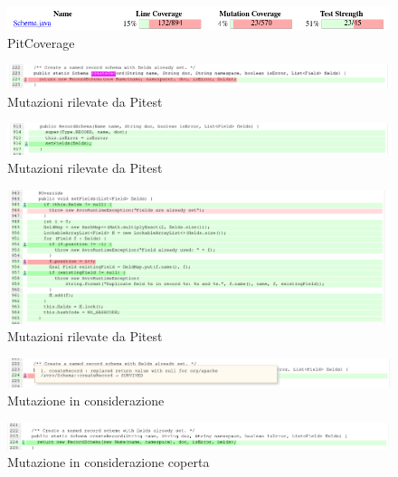 \documentclass[12pt, a4paper]{article}
\begin{document}
  \begin{figure}
    \includegraphics[width=\linewidth]{./images/create_record/PitCoverage1.png}
    \caption{PitCoverage}
    \label{fig:PitMutationCreateRecord1}
  \end{figure}

  \begin{figure}
    \includegraphics[width=\linewidth]{./images/create_record/PitCoverage2.png}
    \caption{Mutazioni rilevate da Pitest}
    \label{fig:PitMutationCreateRecord2}
  \end{figure}

  \begin{figure}
    \includegraphics[width=\linewidth]{./images/create_record/PitCoverage3.png}
    \caption{Mutazioni rilevate da Pitest}
    \label{fig:PitMutationCreateRecord3}
  \end{figure}

  \begin{figure}
    \includegraphics[width=\linewidth]{./images/create_record/PitCoverage4.png}
    \caption{Mutazioni rilevate da Pitest}
    \label{fig:PitMutationCreateRecord4}
  \end{figure}

  \begin{figure}
    \includegraphics[width=\linewidth]{./images/create_record/PitCoverage5.png}
    \caption{Mutazione in considerazione}
    \label{fig:PitMutationCreateRecord5}
  \end{figure}

  \begin{figure}
    \includegraphics[width=\linewidth]{./images/create_record/PitCoverage6.png}
    \caption{Mutazione in considerazione coperta}
    \label{fig:PitMutationCreateRecord6}
  \end{figure}
  
\end{document}
